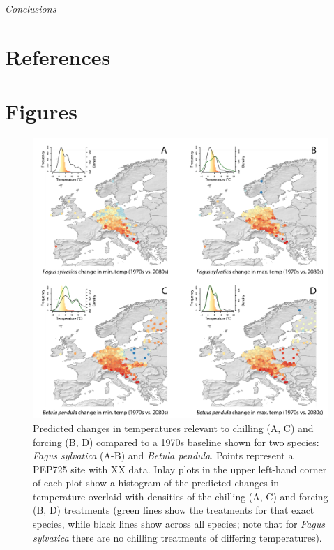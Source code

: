 \documentclass[11pt,letter]{article}
\begin{document}
\emph{Conclusions}

\section{References}



\section{Figures}

\newpage
\begin{figure}[t!]
\centering
\includegraphics[width=1\textwidth]{figures/Fig1_noblues_densities.png}
\caption{Predicted changes in temperatures relevant to chilling (A, C) and forcing (B, D) compared to a 1970s baseline shown for two species: \emph{Fagus sylvatica} (A-B) and \emph{Betula pendula}. Points represent a PEP725 site with XX data. Inlay plots in the upper left-hand corner of each plot show a histogram of the predicted changes in temperature overlaid with densities of the chilling (A, C) and forcing (B, D) treatments (green lines show the treatments for that exact species, while black lines show across all species; note that for \emph{Fagus sylvatica} there are no chilling treatments of differing temperatures).}
  \label{fig:pep}
\end{figure}
\clearpage
\end{document}
